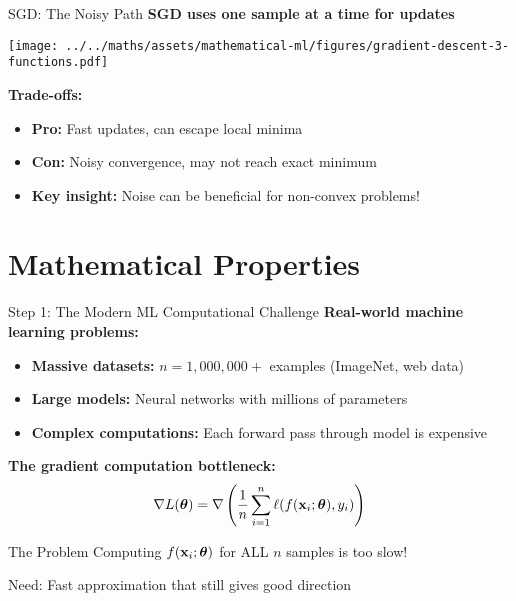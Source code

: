 \documentclass[usenames,dvipsnames]{beamer}
\begin{document}
  \begin{frame}{SGD: The Noisy Path}
    \textbf{SGD uses one sample at a time for updates}
    
    \begin{center}
    \texttt{[image: ../../maths/assets/mathematical-ml/figures/gradient-descent-3-functions.pdf]}
    \end{center}
    
    \pause
    \textbf{Trade-offs:}
    \begin{itemize}[<+->]
        \item \textbf{Pro:} Fast updates, can escape local minima
        \item \textbf{Con:} Noisy convergence, may not reach exact minimum
        \item \textbf{Key insight:} Noise can be beneficial for non-convex problems!
    \end{itemize}
  \end{frame}

  \section{Mathematical Properties}

  \begin{frame}{Step 1: The Modern ML Computational Challenge}
    \textbf{Real-world machine learning problems:}
    
    \begin{itemize}[<+->]
        \item \textbf{Massive datasets:} $n = 1,000,000+$ examples (ImageNet, web data)
        \item \textbf{Large models:} Neural networks with millions of parameters
        \item \textbf{Complex computations:} Each forward pass through model is expensive
    \end{itemize}
    
    \pause
    \textbf{The gradient computation bottleneck:}
    $$\nabla L(\boldsymbol{\theta}) = \nabla \left(\frac{1}{n}\sum_{i=1}^n \ell(f(\mathbf{x}_i;\boldsymbol{\theta}),y_i)\right)$$
    
    \pause
    \begin{alertbox}{The Problem}
    Computing $f(\mathbf{x}_i;\boldsymbol{\theta})$ for ALL $n$ samples is too slow!
    
    Need: Fast approximation that still gives good direction
    \end{alertbox}
  \end{frame}
\end{document}
